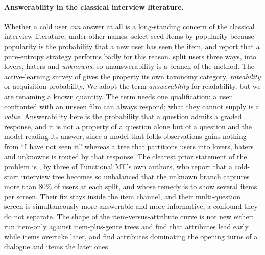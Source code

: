 \documentclass[manuscript,screen,review]{acmart}
\begin{document}
\paragraph{Answerability in the classical interview literature.}\label{sec:answerability} Whether a cold user \emph{can} answer at all is a long-standing concern of the classical interview literature, under other names. \citet{rashid2002getting} select seed items by popularity because popularity is the probability that a new user has seen the item, and report that a pure-entropy strategy performs badly for this reason. \citet{golbandi2011adaptive} split users three ways, into lovers, haters and \emph{unknowns}, so unanswerability is a branch of the method. The active-learning survey of \citet{elahi2016survey} gives the property its own taxonomy category, \emph{rateability} or acquisition probability. We adopt the term \emph{answerability} for readability, but we are renaming a known quantity. The term needs one qualification: a user confronted with an unseen film can always respond; what they cannot supply is a \emph{value}. Answerability here is the probability that a question admits a graded response, and it is not a property of a question alone but of a question and the model reading its answer, since a model that folds observations gains nothing from ``I have not seen it'' whereas a tree that partitions users into lovers, haters and unknowns is routed by that response. The clearest prior statement of the problem is \citet{sun2013learning}, by three of Functional MF's own authors, who report that a cold-start interview tree becomes so unbalanced that the unknown branch captures more than $80\%$ of users at each split, and whose remedy is to show several items per screen. Their fix stays inside the item channel, and their multi-question screen is simultaneously more answerable and more informative, a confound they do not separate. The shape of the item-versus-attribute curve is not new either: \citet{gharahighehi2025pairwise} run item-only against item-plus-genre trees and find that attributes lead early while items overtake later, and \citet{xia2026when} find attributes dominating the opening turns of a dialogue and items the later ones.
\end{document}
